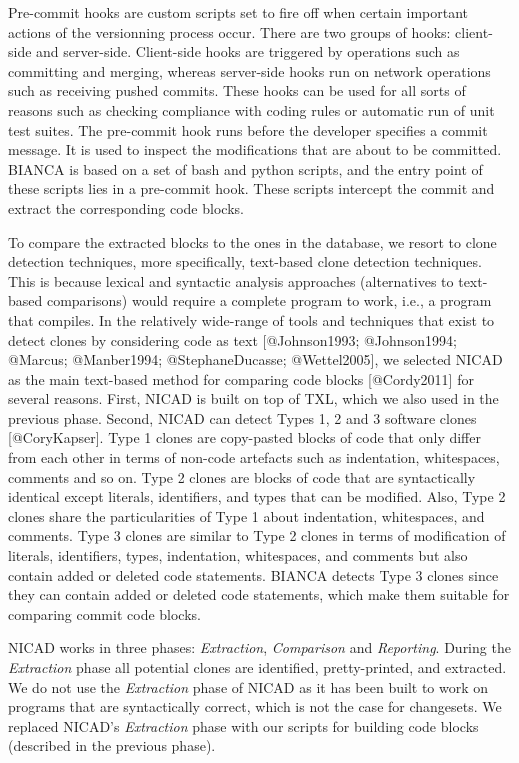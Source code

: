 Pre-commit hooks are custom scripts set to fire off when certain
important actions of the versionning process occur. There are two groups
of hooks: client-side and server-side. Client-side hooks are triggered
by operations such as committing and merging, whereas server-side hooks
run on network operations such as receiving pushed commits. These hooks
can be used for all sorts of reasons such as checking compliance with
coding rules or automatic run of unit test suites. The pre-commit hook
runs before the developer specifies a commit message. It is used to
inspect the modifications that are about to be committed. BIANCA is
based on a set of bash and python scripts, and the entry point of these
scripts lies in a pre-commit hook. These scripts intercept the commit
and extract the corresponding code blocks.

To compare the extracted blocks to the ones in the database, we resort
to clone detection techniques, more specifically, text-based clone
detection techniques. This is because lexical and syntactic analysis
approaches (alternatives to text-based comparisons) would require a
complete program to work, i.e., a program that compiles. In the
relatively wide-range of tools and techniques that exist to detect
clones by considering code as text {[}@Johnson1993; @Johnson1994;
@Marcus; @Manber1994; @StephaneDucasse; @Wettel2005{]}, we selected
NICAD as the main text-based method for comparing code blocks
{[}@Cordy2011{]} for several reasons. First, NICAD is built on top of
TXL, which we also used in the previous phase. Second, NICAD can detect
Types 1, 2 and 3 software clones {[}@CoryKapser{]}. Type 1 clones are
copy-pasted blocks of code that only differ from each other in terms of
non-code artefacts such as indentation, whitespaces, comments and so on.
Type 2 clones are blocks of code that are syntactically identical except
literals, identifiers, and types that can be modified. Also, Type 2
clones share the particularities of Type 1 about indentation,
whitespaces, and comments. Type 3 clones are similar to Type 2 clones in
terms of modification of literals, identifiers, types, indentation,
whitespaces, and comments but also contain added or deleted code
statements. BIANCA detects Type 3 clones since they can contain added or
deleted code statements, which make them suitable for comparing commit
code blocks.

NICAD works in three phases: \emph{Extraction}, \emph{Comparison} and
\emph{Reporting}. During the \emph{Extraction} phase all potential
clones are identified, pretty-printed, and extracted. We do not use the
\emph{Extraction} phase of NICAD as it has been built to work on
programs that are syntactically correct, which is not the case for
changesets. We replaced NICAD's \emph{Extraction} phase with our scripts
for building code blocks (described in the previous phase).

